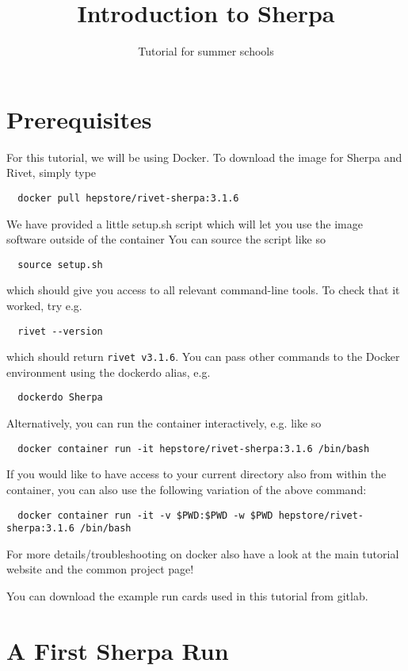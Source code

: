 \documentclass[10pt]{article}
\begin{document}
\title{{\Huge\bf Introduction to Sherpa}}
\author{{\Large Tutorial for summer schools}}
\date{}
\maketitle

\section{Prerequisites}

For this tutorial, we will be using Docker. To download the image for Sherpa and Rivet, simply type
%
\begin{verbatim}
  docker pull hepstore/rivet-sherpa:3.1.6
\end{verbatim}
%
We have provided a little setup.sh script which will let you use the image
software outside of the container
%
You can source the script like so
%
\begin{verbatim}
  source setup.sh
\end{verbatim}
%
which should give you access to all relevant command-line tools. To check that
it worked, try e.g.
%
\begin{verbatim}
  rivet --version
\end{verbatim}
%
which should return \texttt{rivet v3.1.6}. You can pass other commands to the
Docker environment using the dockerdo alias, e.g.
%
\begin{verbatim}
  dockerdo Sherpa
\end{verbatim}
%
Alternatively, you can run the container interactively, e.g. like so
%
\begin{verbatim}
  docker container run -it hepstore/rivet-sherpa:3.1.6 /bin/bash
\end{verbatim}
%
If you would like to have access to your current directory also from within the container,
you can also use the following variation of the above command:
%
\begin{verbatim}
  docker container run -it -v $PWD:$PWD -w $PWD hepstore/rivet-sherpa:3.1.6 /bin/bash
\end{verbatim}
%
For more details/troubleshooting on docker also have a look at the main tutorial
website and the common project page!

You can download the example run cards used in this tutorial from gitlab.

\section{A First Sherpa Run}
\end{document}
